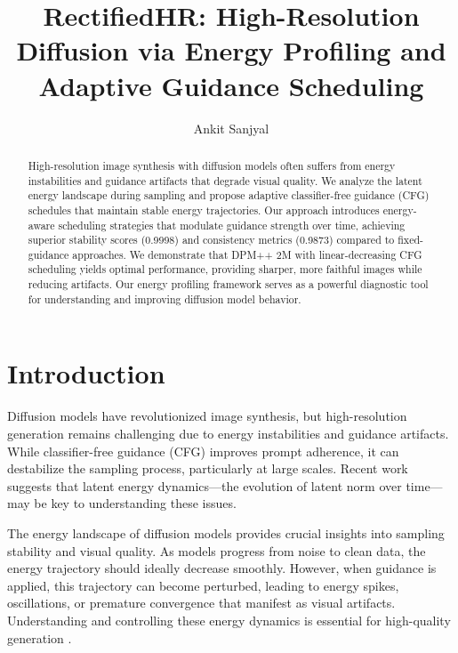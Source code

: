 \documentclass[10pt,twocolumn]{article}
\title{RectifiedHR: High-Resolution Diffusion via Energy Profiling and Adaptive Guidance Scheduling}
\author[1]{Ankit Sanjyal}
\affil[1]{Fordham University, as505@fordham.edu}
\date{} %
\begin{document}
\maketitle

\begin{abstract}
High-resolution image synthesis with diffusion models often suffers from energy instabilities and guidance artifacts that degrade visual quality. We analyze the latent energy landscape during sampling and propose adaptive classifier-free guidance (CFG) schedules that maintain stable energy trajectories. Our approach introduces energy-aware scheduling strategies that modulate guidance strength over time, achieving superior stability scores (0.9998) and consistency metrics (0.9873) compared to fixed-guidance approaches. We demonstrate that DPM++ 2M with linear-decreasing CFG scheduling yields optimal performance, providing sharper, more faithful images while reducing artifacts. Our energy profiling framework serves as a powerful diagnostic tool for understanding and improving diffusion model behavior.
\end{abstract}

\section{Introduction}
Diffusion models \cite{ho2020denoising,rombach2022high,goodfellow2014generative} have revolutionized image synthesis, but high-resolution generation remains challenging due to energy instabilities and guidance artifacts. While classifier-free guidance (CFG) \cite{ho2022classifier,nichol2022glide} improves prompt adherence, it can destabilize the sampling process, particularly at large scales. Recent work \cite{song2023rectifiedflow,wang2023hiresfix,bao2022analytic} suggests that latent energy dynamics---the evolution of latent norm over time---may be key to understanding these issues.

The energy landscape of diffusion models provides crucial insights into sampling stability and visual quality. As models progress from noise to clean data, the energy trajectory should ideally decrease smoothly. However, when guidance is applied, this trajectory can become perturbed, leading to energy spikes, oscillations, or premature convergence that manifest as visual artifacts. Understanding and controlling these energy dynamics is essential for high-quality generation \cite{zhang2018unreasonable,blau2018perception}.
\end{document}
